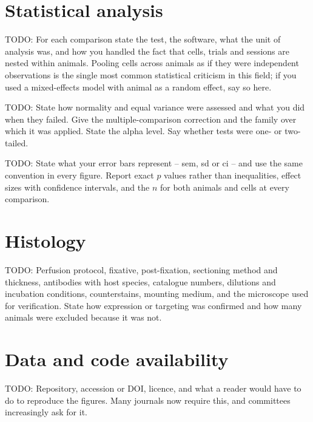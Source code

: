 	\section{Statistical analysis}\label{section:methods:statistics}

		TODO: For each comparison state the test, the software, what the unit
		of analysis was, and how you handled the fact that cells, trials and
		sessions are nested within animals. Pooling cells across animals as if
		they were independent observations is the single most common
		statistical criticism in this field; if you used a mixed-effects model
		with animal as a random effect, say so here.

		TODO: State how normality and equal variance were assessed and what you
		did when they failed. Give the multiple-comparison correction and the
		family over which it was applied. State the alpha level. Say whether
		tests were one- or two-tailed.

		TODO: State what your error bars represent -- \acrshort{sem},
		\acrshort{sd} or \acrshort{ci} -- and use the same convention in every
		figure. Report exact $p$ values rather than inequalities, effect sizes
		with confidence intervals, and the $n$ for both animals and cells at
		every comparison.

	\section{Histology}\label{section:methods:histology}

		TODO: Perfusion protocol, fixative, post-fixation, sectioning method
		and thickness, antibodies with host species, catalogue numbers,
		dilutions and incubation conditions, counterstains, mounting medium,
		and the microscope used for verification. State how expression or
		targeting was confirmed and how many animals were excluded because it
		was not.

	\section{Data and code availability}\label{section:methods:availability}

		TODO: Repository, accession or DOI, licence, and what a reader would
		have to do to reproduce the figures. Many journals now require this,
		and committees increasingly ask for it.
